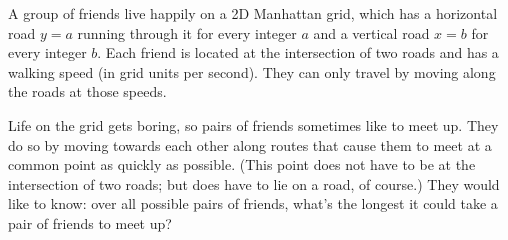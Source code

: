 




A group of friends live happily on a 2D Manhattan grid, which has a horizontal road $y=a$ running through it for every integer $a$ and a vertical road $x=b$ for every integer $b$. Each friend is located at the intersection of two roads and has a walking speed (in grid units per second). They can only travel by moving along the roads at those speeds.

Life on the grid gets boring, so pairs of friends sometimes like to meet up. They do so by moving towards each other along routes that cause them to meet at a common point as quickly as possible. (This point does not have to be at the intersection of two roads; but does have to lie on a road, of course.) They would like to know: over all possible pairs of friends, what's the longest it could take a pair of friends to meet up?

